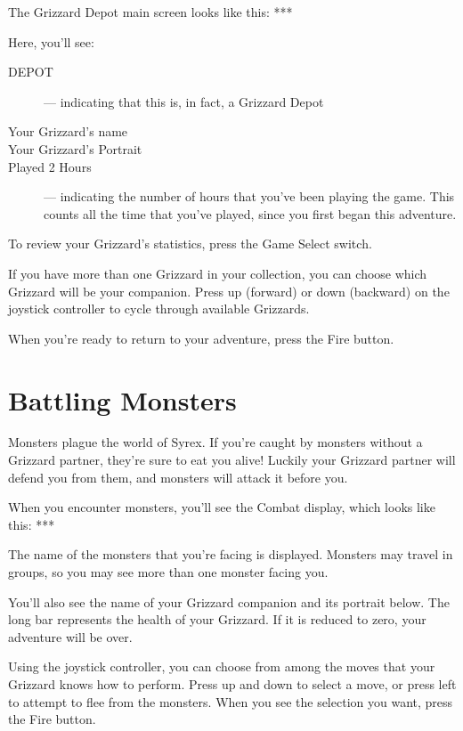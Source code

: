 \documentclass[12pt,twoside,openright,book]{memoir}
\begin{document}
The Grizzard Depot main screen looks like this: ***

Here, you'll see:

\begin{description}
  
\item[DEPOT] --- indicating that this is, in fact, a Grizzard Depot
\item[Your Grizzard's name] 
\item[Your Grizzard's Portrait] 
\item[Played 2  Hours] ---  indicating the number  of hours  that you've
  been playing  the game. This counts  all the time that  you've played,
  since you first began this adventure.

\end{description}

To review your Grizzard's statistics, press the Game Select switch.

If you  have more than one  Grizzard in your collection,  you can choose
which  Grizzard will  be  your  companion. Press  up  (forward) or  down
(backward)  on  the  joystick  controller  to  cycle  through  available
Grizzards.

When you're ready to return to your adventure, press the Fire button.


\section{Battling Monsters}

Monsters plague the world of Syrex. If you're caught by monsters without
a Grizzard partner, they're sure to eat you alive! Luckily your Grizzard
partner  will  defend  you  from  them,  and  monsters  will  attack  it
before you.

When you encounter monsters, you'll  see the Combat display, which looks
like this: ***

The name of  the monsters that you're facing is  displayed. Monsters may
travel in groups, so you may see more than one monster facing you.

You'll also  see the name  of your  Grizzard companion and  its portrait
below. The  long bar represents  the health of  your Grizzard. If  it is
reduced to zero, your adventure will be over.

Using the joystick controller, you can  choose from among the moves that
your Grizzard knows how to perform. Press  up and down to select a move,
or press  left to attempt  to flee from the  monsters. When you  see the
selection you want, press the Fire button.
\end{document}
